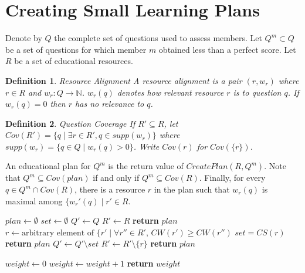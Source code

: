 \documentclass{article}
\newtheorem{definition}{Definition}
\begin{document}
\section{Creating Small Learning Plans}
Denote by $Q$ the complete set of questions used to assess members.  Let $Q^m \subset Q$ be a set of questions for which member $m$ obtained less than a perfect score. Let $R$ be a set of educational resources.  

\begin{definition}{Resource Alignment}
A resource alignment is a pair $(r,w_r)$ where $r \in R$ and $w_r:Q\rightarrow\mathbb{N}$. $w_r(q)$ denotes how relevant resource $r$ is to question $q$. If $w_r(q) = 0$ then $r$ has no relevance to $q$.
\end{definition}

\begin{definition}{Question Coverage}
If $R'\subseteq R$, let 
$Cov(R')= \lbrace q\mid\exists r \in R', q \in supp(w_r) \rbrace$ where $supp(w_r)=\lbrace q\in Q\mid w_r(q) > 0 \rbrace$. Write $Cov(r)$ for $Cov(\lbrace r \rbrace)$.
\end{definition}

\noindent An educational plan for $Q^m$ is the return value of $CreatePlan(R,Q^m)$. Note that $Q^m  \subseteq Cov(plan)$ if and only if $Q^m \subseteq Cov(R)$. Finally, for every $q \in Q^m \cap Cov(R)$, there is a resource $r$ in the plan such that $w_r(q)$ is maximal among $\lbrace w_r'(q) \mid r' \in R$. 

\begin{algorithm}
 \begin{algorithmic}[1]
 \State $plan\gets \emptyset$
 \State $set\gets\emptyset$
 \State $Q'\gets Q$
 \State $R'\gets R$
 		\State \textbf{return} $plan$ 
 	\EndIf
 	\State $r\gets \text{arbitrary element of } \lbrace r' \mid \forall r'' \in R'\text{, } 		CW(r') \geq CW(r'')$
 	\State $set = CS(r)$
 		\State \textbf{return} $plan$ 
 	\EndIf
 	\State $Q'\gets Q'\setminus set$
 	\State $R'\gets R'\setminus \lbrace r \rbrace$
 \EndWhile
 \State \textbf{return} $plan$
 \EndFunction
 \end{algorithmic}
 \caption{Create a small learning plan}
\end{algorithm}

\begin{algorithm}
 \begin{algorithmic}[1]
  
 \State $weight \gets 0$
 		\State $weight\gets weight + 1$
 	\EndIf
 \EndFor
 \State \textbf{return} $weight$
 \EndFunction
 \end{algorithmic}
 \caption{Get resource relative covering weight.}
\end{algorithm}
\end{document}
